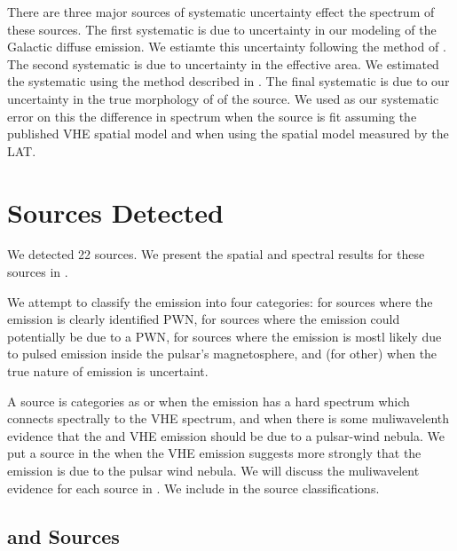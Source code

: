 There are three major sources of systematic uncertainty
effect the spectrum of these sources. The first systematic
is due to uncertainty in our modeling of the Galactic diffuse
emission.  We estiamte this uncertainty following the method of
.  The second systematic is due
to uncertainty in the effective area.  We estimated the systematic
using the method described in \cite{ackermann_2012a_fermi-large}.
The final systematic is due to our uncertainty in the true morphology of
of the source. We used as our systematic error on this the difference
in spectrum when the source is fit assuming the published \ac{VHE} spatial
model and when using the spatial model measured by the LAT.

\section{Sources Detected}



We detected 22 sources.  We present
the spatial and spectral results for these sources in
.

We attempt to classify the \gev emission into four categories: \PWNClass
for sources where the \gev emission is clearly identified \ac{PWN},
\PWNcClass for sources where the \gev emission could potentially be due
to a \ac{PWN}, \PSRClass for sources where the emission is mostl likely
due to pulsed emission inside the pulsar's magnetosphere, and \OtherClass
(for other) when the true nature of emission is uncertaint.

A source is categories as \PWNClass or \PWNcClass when the emission has a
hard spectrum which connects spectrally to the \ac{VHE} spectrum, and when
there is some muliwavelenth evidence that the \gev and \ac{VHE} emission
should be due to a pulsar-wind nebula.  We put a source in the \PWNClass
when the \ac{VHE} emission suggests more strongly that the emission is
due to the pulsar wind nebula. We will discuss the muliwavelent evidence
for each \PWNClass source in .  We include
in  the source classifications.



\subsection{\PWNClass and \PWNcClass Sources}

